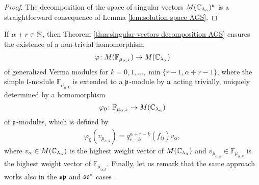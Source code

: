 \begin{proof}The decomposition of the space of singular vectors $M(\mathbb{C}_{\lambda_\alpha})^\mathfrak{u}$ is a straightforward consequence of Lemma \ref{lem:solution space AGS}.
\end{proof}

If $\alpha+r \in \mathbb{N}$, then Theorem \ref{thm:singular vectors decomposition AGS} ensures the existence of a non-trivial homomorphism
\begin{align}
  \varphi \colon M(\mathbb{F}_{\mu_{\alpha,k}}) \rightarrow M(\mathbb{C}_{\lambda_\alpha})
\end{align}
of generalized Verma modules for $k=0,1,\dots,\min\{r-1,\alpha+r-1\}$, where the simple $\mathfrak{l}$-module $\mathbb{F}_{\mu_{\alpha,k}}$ is extended to a $\mathfrak{p}$-module by $\mathfrak{u}$ acting trivially, uniquely determined by a homomorphism
\begin{align}
  \varphi_0 \colon \mathbb{F}_{\mu_{\alpha,k}} \rightarrow M(\mathbb{C}_{\lambda_\alpha})
\end{align}
of $\mathfrak{p}$-modules, which is defined by
\begin{align}
  \varphi_0(v_{\mu_{\alpha,k}})= q^{\alpha+r-k}_{r-k}(f_{ij}) v_\alpha,
\end{align}
where $v_\alpha \in M(\mathbb{C}_{\lambda_\alpha})$ is the highest weight vector of $M(\mathbb{C}_{\lambda_\alpha})$ and $v_{\mu_{\alpha,k}} \in \mathbb{F}_{\mu_{\alpha,k}}$ is the highest weight vector of $\mathbb{F}_{\mu_{\alpha,k}}$. Finally, let us remark that the same approach works also in the $\mathfrak{sp}$ and $\mathfrak{so}^*$ cases \cite{krizka_invariant_2017}. 